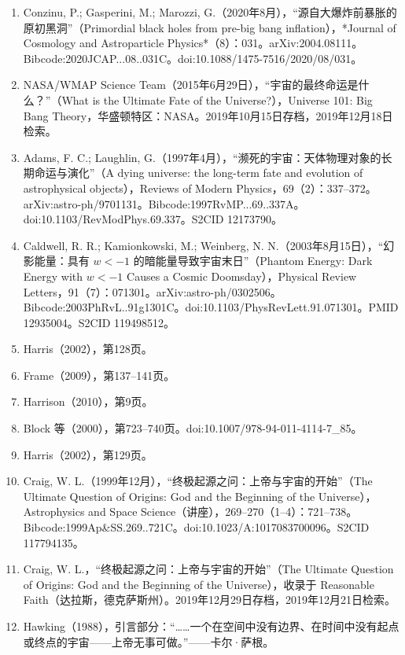 \begin{enumerate}
\item Conzinu, P.; Gasperini, M.; Marozzi, G.（2020年8月），“源自大爆炸前暴胀的原初黑洞”（Primordial black holes from pre-big bang inflation），*Journal of Cosmology and Astroparticle Physics*（8）：031。arXiv:2004.08111。Bibcode:2020JCAP...08..031C。doi:10.1088/1475-7516/2020/08/031。  
\item NASA/WMAP Science Team（2015年6月29日），“宇宙的最终命运是什么？”（What is the Ultimate Fate of the Universe?），Universe 101: Big Bang Theory，华盛顿特区：NASA。2019年10月15日存档，2019年12月18日检索。  
\item Adams, F. C.; Laughlin, G.（1997年4月），“濒死的宇宙：天体物理对象的长期命运与演化”（A dying universe: the long-term fate and evolution of astrophysical objects），Reviews of Modern Physics，69（2）：337–372。arXiv:astro-ph/9701131。Bibcode:1997RvMP...69..337A。doi:10.1103/RevModPhys.69.337。S2CID 12173790。  
\item Caldwell, R. R.; Kamionkowski, M.; Weinberg, N. N.（2003年8月15日），“幻影能量：具有 $w<-1$ 的暗能量导致宇宙末日”（Phantom Energy: Dark Energy with $w<-1$ Causes a Cosmic Doomsday），Physical Review Letters，91（7）：071301。arXiv:astro-ph/0302506。Bibcode:2003PhRvL..91g1301C。doi:10.1103/PhysRevLett.91.071301。PMID 12935004。S2CID 119498512。  
\item Harris（2002），第128页。  
\item Frame（2009），第137–141页。  
\item Harrison（2010），第9页。  
\item Block 等（2000），第723–740页。doi:10.1007/978-94-011-4114-7_85。  
\item Harris（2002），第129页。  
\item Craig, W. L.（1999年12月），“终极起源之问：上帝与宇宙的开始”（The Ultimate Question of Origins: God and the Beginning of the Universe），Astrophysics and Space Science（讲座），269–270（1–4）：721–738。Bibcode:1999Ap&SS.269..721C。doi:10.1023/A:1017083700096。S2CID 117794135。  
\item Craig, W. L.，“终极起源之问：上帝与宇宙的开始”（The Ultimate Question of Origins: God and the Beginning of the Universe），收录于 Reasonable Faith（达拉斯，德克萨斯州）。2019年12月29日存档，2019年12月21日检索。  
\item Hawking（1988），引言部分：“……一个在空间中没有边界、在时间中没有起点或终点的宇宙——上帝无事可做。”——卡尔·萨根。
\end{enumerate}
